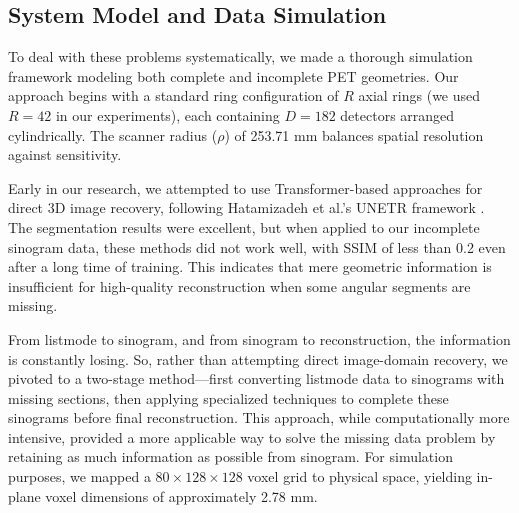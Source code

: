\documentclass[12pt]{iopart}
\begin{document}
\subsection{System Model and Data Simulation}

To deal with these problems systematically, we made a thorough simulation framework modeling both complete and incomplete PET geometries. Our approach begins with a standard ring configuration of $R$ axial rings (we used $R=42$ in our experiments), each containing $D=182$ detectors arranged cylindrically. The scanner radius ($\rho$) of 253.71 mm balances spatial resolution against sensitivity.

Early in our research, we attempted to use Transformer-based approaches for direct 3D image recovery, following Hatamizadeh et al.'s UNETR framework \cite{hatamizadeh2021unetrtransformers3dmedical}. The segmentation results were excellent, but when applied to our incomplete sinogram data, these methods did not work well, with SSIM of less than 0.2 even after a long time of training. This indicates that mere geometric information is insufficient for high-quality reconstruction when some angular segments are missing. 



From listmode to sinogram, and from sinogram to reconstruction, the information is constantly losing. So, rather than attempting direct image-domain recovery, we pivoted to a two-stage method—first converting listmode data to sinograms with missing sections, then applying specialized techniques to complete these sinograms before final reconstruction. This approach, while computationally more intensive, provided a more applicable way to solve the missing data problem by retaining as much information as possible from sinogram.
For simulation purposes, we mapped a $80\times128\times128$ voxel grid to physical space, yielding in-plane voxel dimensions of approximately 2.78 mm.

\end{document}
